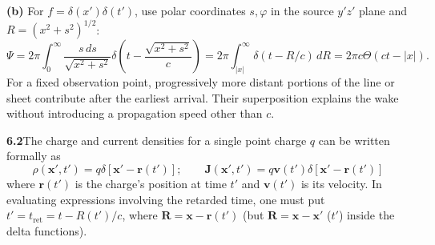 \textbf{(b)} For $f=\delta(x')\delta(t')$, use polar coordinates $s,\varphi$
in the source $y'z'$ plane and $R=(x^2+s^2)^{1/2}$:
\[
\Psi=2\pi\int_0^\infty\frac{s\,ds}{\sqrt{x^2+s^2}}
\delta\left(t-\frac{\sqrt{x^2+s^2}}c\right)
=2\pi\int_{|x|}^{\infty}\delta(t-R/c)\,dR
=\boxed{2\pi c\Theta(ct-|x|)}.
\]
For a fixed observation point, progressively more distant portions of the
line or sheet contribute after the earliest arrival. Their superposition
explains the wake without introducing a propagation speed other than $c$.

\par\bigskip
\noindent\textbf{6.2}\quad The charge and current densities for a single point charge $q$ can be written formally as
\[
\rho(\mathbf{x}',t')=q\delta[\mathbf{x}'-\mathbf{r}(t')];\qquad \mathbf{J}(\mathbf{x}',t')=q\mathbf{v}(t')\delta[\mathbf{x}'-\mathbf{r}(t')]
\]
where $\mathbf{r}(t')$ is the charge's position at time $t'$ and $\mathbf{v}(t')$ is its velocity. In evaluating expressions involving the retarded time, one must put $t'=t_{\mathrm{ret}}=t-R(t')/c$, where $\mathbf{R}=\mathbf{x}-\mathbf{r}(t')$ (but $\mathbf{R}=\mathbf{x}-\mathbf{x}'$ ($t'$) inside the delta functions).
